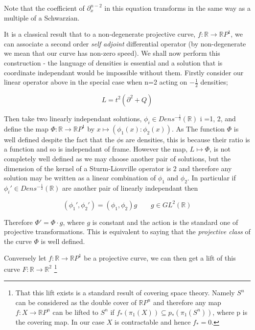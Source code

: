 Note that the coefficient of $\partial_{x}^{n-2}$ in this equation transforms in the same way as a multiple of a Schwarzian.


It is a classical result that to a non-degenerate projective curve, $f:\mathbb{R} \rightarrow \mathbb{R}P^{1}$, we can associate a second order \emph{self adjoint} differential operator (by non-degenerate we mean that our curve has non-zero speed). We shall now perform this construction - the language of densities is essential and a solution that is coordinate independant would be impossible without them. Firstly consider our linear operator above in the special case when n=2 acting on $-\frac{1}{2}$ densities;

\[ L = t^{2}( \partial^{2} + Q) \]

Then take two linearly independant solutions, $\phi_{i} \in Dens^{-\frac{1}{2}}(\mathbb{R})$ i =1, 2, and define the map $\Phi:\mathbb{R} \rightarrow \mathbb{R}P^{1}$ by $x \mapsto (\phi_{1}(x) : \phi_{2}(x))$. As The function $\Phi$ is well defined despite the fact that the $\phi$s are densities, this is because their ratio is a function and so is independant of frame. However the map, $L \mapsto \Phi$, is not completely well defined as we may choose another pair of solutions, but the dimension of the kernel of a Sturm-Liouville operator is 2 and therefore any solution may be written as a linear combination of $\phi_{1}$ and $\phi_{2}$. In particular if $\phi_{i}' \in Dens^{-\frac{1}{2}}(\mathbb{R})$ are another pair of linearly independant then

\[ (\phi_{1}' , \phi_{2}') = (\phi_{1} , \phi_{2}) g \quad \quad g \in GL^{2}(\mathbb{R}) \]

Therefore $\Phi' = \Phi \cdot g$, where $g$ is constant and the action is the standard one of projective transformations. This is equivalent to saying that the \emph{projective class} of the curve $\Phi$ is well defined.


Conversely let $f: \mathbb{R} \rightarrow \mathbb{R}P^{1}$ be a projective curve, we can then get a lift of this curve $F: \mathbb{R} \rightarrow \mathbb{R}^{2}$ \footnote[1]{That this lift exists is a standard result of covering space theory. Namely $S^{n}$ can be considered as the double cover of $\mathbb{R}P^{n}$ and therefore any map $f:X \rightarrow \mathbb{R}P^{n}$ can be lifted to $S^{n}$ if $f_{\ast}(\pi_{1}(X)) \subseteq p_{\ast}(\pi_{1}(S^{n}))$, where p is the covering map. In our case $X$ is contractable and hence $f_{\ast} = 0$.}


 

\bye